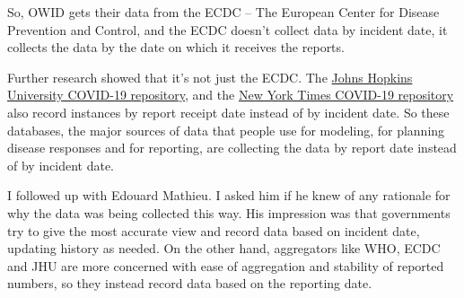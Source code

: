 \documentclass[10pt,reqno]{amsart}
\begin{document}
So, OWID gets their data from the ECDC -- The European Center for
Disease Prevention and Control, and the ECDC doesn't collect data by
incident date, it collects the data by the date on which it receives
the reports.

Further research showed that it's not just the ECDC.  The
\href{https://github.com/CSSEGISandData/COVID-19}{Johns Hopkins
  University COVID-19 repository}, and the
\href{https://github.com/nytimes/covid-19-data}{New York Times
  COVID-19 repository} also record instances by report receipt date
instead of by incident date.  So these databases, the major sources of
data that people use for modeling, for planning disease responses and
for reporting, are collecting the data by report date instead of by
incident date.\nocite{JHU2020data,NYT2020data}

I followed up with Edouard Mathieu.  I asked him if he knew of any
rationale for why the data was being collected this way.  His
impression was that governments try to give the most accurate view and
record data based on incident date, updating history as needed.  On
the other hand, aggregators like WHO, ECDC and JHU are more concerned
with ease of aggregation and stability of reported numbers, so they
instead record data based on the reporting date.\cite{Mathieu2020Dates}





\end{document}
